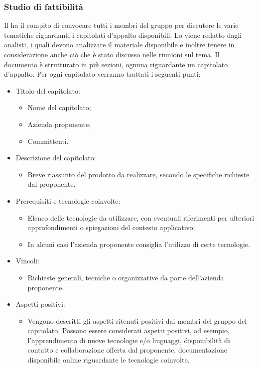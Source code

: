 \subsubsection{Studio di fattibilità}
Il \Responsabile{} ha il compito di convocare tutti i membri del gruppo \Gruppo{} per discutere le varie tematiche riguardanti i capitolati d'appalto disponibili.
Lo \SdF{} viene redatto dagli analisti, i quali devono analizzare il materiale disponibile e inoltre tenere in considerazione anche ciò che è stato discusso nelle riunioni sul tema.
Il documento è strutturato in più sezioni, ognuna riguardante un capitolato d'appalto.
Per ogni capitolato verranno trattati i seguenti punti:
\begin{itemize}
\item Titolo del capitolato:
	\begin{itemize}
	\item Nome del capitolato;
	\item Azienda proponente;
	\item Committenti.
	\end{itemize}
\item Descrizione del capitolato:
	\begin{itemize}
	\item Breve riassunto del prodotto da realizzare, secondo le specifiche richieste dal proponente.
	\end{itemize}
\item Prerequisiti e tecnologie coinvolte:
	\begin{itemize}
	\item Elenco delle tecnologie da utilizzare, con eventuali riferimenti per ulteriori approfondimenti o spiegazioni del contesto applicativo;
	\item In alcuni casi l'azienda proponente consiglia l'utilizzo di certe tecnologie.
	\end{itemize}
\item Vincoli:
	\begin{itemize}
	\item Richieste generali, tecniche o organizzative da parte dell'azienda proponente.
	\end{itemize}
\item Aspetti positivi:
	\begin{itemize}
	\item Vengono descritti gli aspetti ritenuti positivi dai membri del gruppo \Gruppo{} del capitolato.
	Possono essere considerati aspetti positivi, ad esempio, l'apprendimento di nuove tecnologie e/o linguaggi, disponibilità di contatto e collaborazione offerta dal proponente, documentazione disponibile online riguardante le tecnologie coinvolte.

\end{itemize}
\end{itemize}
